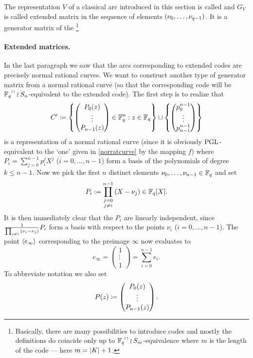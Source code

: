 The representation $V$ of a classical arc introduced in this section is called  and $G_V$ is called extended  matrix in the sequence of elements $\seq{\range{\nu_0}{\nu_{q-1}}}$.
It is a generator matrix of the \footnote{Basically, there are many possibilities to introduce  codes and mostly the definitions do coincide only up to $\units{\field{q}}\wr S_m$-equivalence where $m$ is the length of the code --- here $m=\left\vert{K}\right\vert+1$.}

\paragraph{Extended  matrices.}%
%
In the last paragraph we saw that the arcs corresponding to extended  codes are precisely normal rational curves. We want to construct another type of generator matrix from a normal rational curve (so that the corresponding code will be $\units{\field{q}}\wr S_n$-equivalent to the extended  code).
The first step is to realize that 
$$ C' \defeq \set{
    \begin{pmatrix} P_0(z)             \\
        \vdots                         \\
        P_{n-1}(z)\end{pmatrix}\in\field{q}^n}[z\in \field{q}]
\setjoin\set{\begin{pmatrix} p^{n-1}_0 \\
        \vdots                         \\
        p^{n-1}_{n-1}\end{pmatrix}
} $$
is a representation of a normal rational curve (since it is obviously $\mathrm{PGL}$-equivalent to the `one' given in \autoref{norratcurve} by the mapping $f$) where $P_i=\sum_{j=0}^{n-1}{p_i^j X^j}$ ($i=0,\ldots,n-1$) form a basis of the polynomials of degree $k\leq n-1$. Now we pick the first $n$ distinct elements $\nu_0,\ldots,\nu_{n-1}\in\mathbb{F}_{q}$ and set
$$ P_i := \prod_{\substack{j=0\\ j\neq i}}^{n-1}{(X-\nu_j)}\in\mathbb{F}_{q}[X]\text{.} $$
It is then immediately clear that the $P_i$ are linearly independent, since $\frac 1 {\prod_{j\not= i}{(\nu_i-\nu_j)}}P_i$ form a  basis with respect to the points $\nu_i$ ($i=0,\ldots,n-1$). The point $\gen{e_{\infty}}$ corresponding to the preimage $\infty$ now evaluates to
$$ e_{\infty} = \begin{pmatrix} 1\\ \vdots\\ 1\end{pmatrix} = \sum_{i=0}^{n-1}{e_i}.$$
To abbreviate notation we also set
$$
P(z)\mathrel{\mathrel{\mathop:}\mkern-1.2mu=}\begin{pmatrix} P_0(z)\\ \vdots\\ P_{n-1}(z)\end{pmatrix}\textrm{.}
$$


